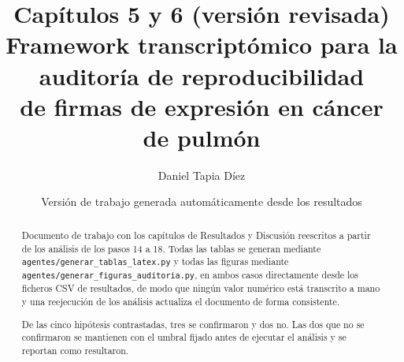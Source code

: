 \documentclass[11pt,a4paper]{article}
\title{\textbf{Capítulos 5 y 6 (versión revisada)}\\[0.3em]
\large Framework transcriptómico para la auditoría de reproducibilidad\\
de firmas de expresión en cáncer de pulmón}
\author{Daniel Tapia Díez}
\date{Versión de trabajo generada automáticamente desde los resultados}
\begin{document}
\maketitle

\begin{abstract}
\noindent Documento de trabajo con los capítulos de Resultados y Discusión
reescritos a partir de los análisis de los pasos 14 a 18. Todas las tablas se
generan mediante \texttt{agentes/generar\_tablas\_latex.py} y todas las figuras
mediante \texttt{agentes/generar\_figuras\_auditoria.py}, en ambos casos
directamente desde los ficheros CSV de resultados, de modo que ningún valor
numérico está transcrito a mano y una reejecución de los análisis actualiza el
documento de forma consistente.

\medskip
\noindent De las cinco hipótesis contrastadas, tres se confirmaron y dos no. Las
dos que no se confirmaron se mantienen con el umbral fijado antes de ejecutar el
análisis y se reportan como resultaron.
\end{abstract}

\tableofcontents
\bigskip



\clearpage

\end{document}
